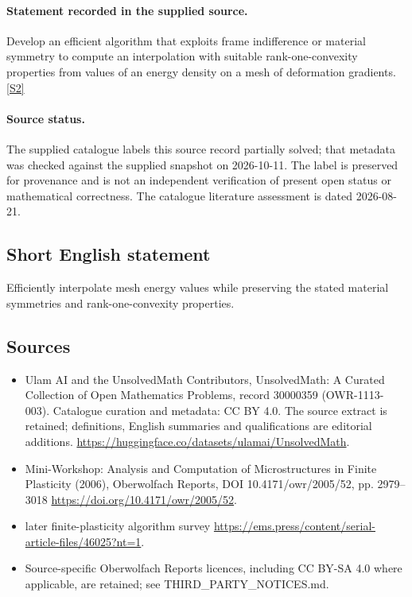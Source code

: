 \documentclass[11pt]{article}
\begin{document}
\paragraph{Statement recorded in the supplied source.}
Develop an efficient algorithm that exploits frame indifference or material symmetry to compute an interpolation with suitable rank-one-convexity properties from values of an energy density on a mesh of deformation gradients. \href{https://doi.org/10.4171/owr/2005/52}{[S2]}
\paragraph{Source status.}
The supplied catalogue labels this source record partially solved; that metadata was checked against the supplied snapshot on 2026-10-11. The label is preserved for provenance and is not an independent verification of present open status or mathematical correctness. The catalogue literature assessment is dated 2026-08-21.
\subsection{Short English statement}
Efficiently interpolate mesh energy values while preserving the stated material symmetries and rank-one-convexity properties.
\subsection{Sources}
\begin{itemize}
\item[S1] Ulam AI and the UnsolvedMath Contributors, UnsolvedMath: A Curated Collection of Open Mathematics Problems, record 30000359 (OWR-1113-003). Catalogue curation and metadata: CC BY 4.0. The source extract is retained; definitions, English summaries and qualifications are editorial additions.
\url{https://huggingface.co/datasets/ulamai/UnsolvedMath}.
\item[S2] Mini-Workshop: Analysis and Computation of Microstructures in Finite Plasticity (2006), Oberwolfach Reports, DOI 10.4171/owr/2005/52, pp. 2979--3018
\url{https://doi.org/10.4171/owr/2005/52}.
\item[S3] later finite-plasticity algorithm survey
\url{https://ems.press/content/serial-article-files/46025?nt=1}.
\item Source-specific Oberwolfach Reports licences, including CC BY-SA 4.0 where applicable, are retained; see THIRD\_PARTY\_NOTICES.md.
\end{itemize}
\end{document}
